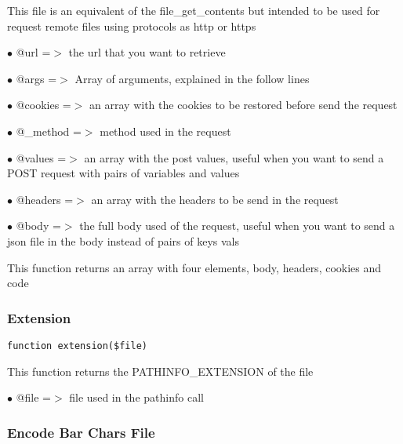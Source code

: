 \documentclass[a4paper]{article}
\begin{document}
This file is an equivalent of the file\_get\_contents but intended to be used
for request remote files using protocols as http or https

\begin{compactitem}
\item[\color{myblue}$\bullet$] @url     =$>$ the url that you want to retrieve
\item[\color{myblue}$\bullet$] @args    =$>$ Array of arguments, explained in the follow lines
\item[\color{myblue}$\bullet$] @cookies =$>$ an array with the cookies to be restored before send the request
\item[\color{myblue}$\bullet$] @\_method =$>$ method used in the request
\item[\color{myblue}$\bullet$] @values  =$>$ an array with the post values, useful when you want to send a POST
            request with pairs of variables and values
\item[\color{myblue}$\bullet$] @headers =$>$ an array with the headers to be send in the request
\item[\color{myblue}$\bullet$] @body    =$>$ the full body used of the request, useful when you want to send a
            json file in the body instead of pairs of keys vals
\end{compactitem}

This function returns an array with four elements, body, headers, cookies and code

\hypertarget{toc135}{}
\subsubsection{Extension}

\begin{lstlisting}
function extension($file)
\end{lstlisting}

This function returns the PATHINFO\_EXTENSION of the file

\begin{compactitem}
\item[\color{myblue}$\bullet$] @file =$>$ file used in the pathinfo call
\end{compactitem}

\hypertarget{toc136}{}
\subsubsection{Encode Bar Chars File}
\end{document}
